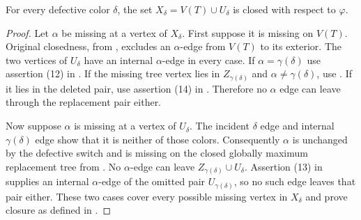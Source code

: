 \begin{lemma}
For every defective color $\delta$, the set
$X_\delta=V(T)\cup U_\delta$ is closed with respect to $\varphi$.
\end{lemma}
\begin{proof}
Let $\alpha$ be missing at a vertex of $X_\delta$.  First suppose it is
missing on $V(T)$.  Original closedness, from
, excludes an $\alpha$-edge from
$V(T)$ to its exterior.  The two vertices of $U_\delta$ have an internal
$\alpha$-edge in every case.  If $\alpha=\gamma(\delta)$ use assertion
(12) in .  If the missing tree
vertex lies in $Z_{\gamma(\delta)}$ and
$\alpha\ne\gamma(\delta)$, use
.  If it lies in the deleted
pair, use assertion (14) in
.  Therefore no $\alpha$ edge can
leave through the replacement pair either.

Now suppose $\alpha$ is missing at a vertex of $U_\delta$.  The incident
$\delta$ edge and internal $\gamma(\delta)$ edge show that it is neither
of those colors.  Consequently $\alpha$ is unchanged by the defective
switch and is missing on the closed globally maximum replacement tree from
.  No $\alpha$-edge can leave
$Z_{\gamma(\delta)}\cup U_\delta$.  Assertion (13) in
 supplies an internal
$\alpha$-edge of the omitted pair $U_{\gamma(\delta)}$, so no such edge
leaves that pair either.  These two cases cover every possible missing
vertex in $X_\delta$ and prove closure as defined in
.
\end{proof}
